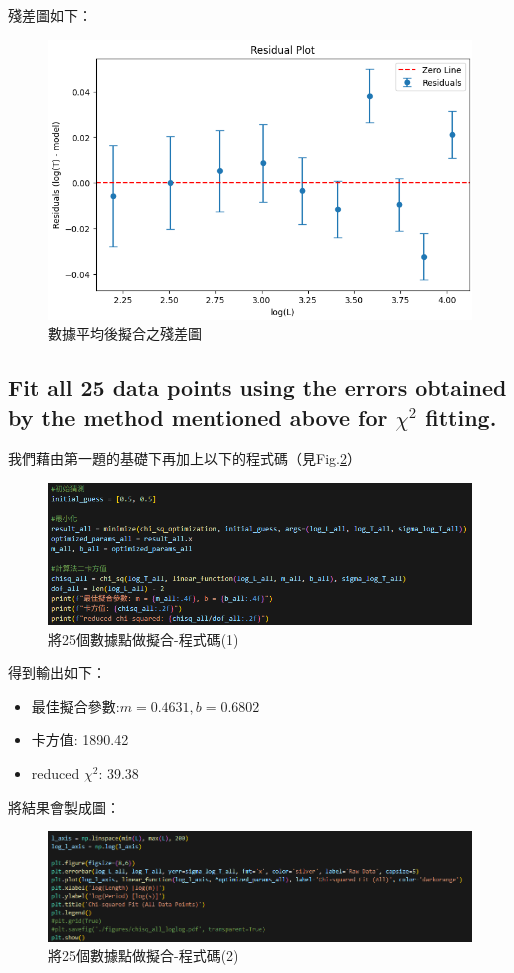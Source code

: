 \documentclass[12pt,a4paper]{article}
\begin{document}
\begin{CJK}{UTF8}{bkai}
殘差圖如下：

\begin{figure}[h]
    \centering
    \includegraphics[width=0.8\linewidth]{aaaaaaaaaaaaaaaa.png}
    \caption{數據平均後擬合之殘差圖}
    \label{fig:enter-label}
\end{figure}

\clearpage
\subsection{Fit all 25 data points using the errors obtained by the method mentioned above for $\chi ^2$ fitting.}
\hfill

我們藉由第一題的基礎下再加上以下的程式碼（見Fig.\ref{fig:Q2-1}）
\begin{figure}[h]
    \centering
    \includegraphics[width=1\linewidth]{Q2.png}
    \caption{將25個數據點做擬合-程式碼(1)}
    \label{fig:Q2-1}
\end{figure}

得到輸出如下：
\begin{itemize}
    \item 最佳擬合參數:$m = 0.4631, b = 0.6802$
    \item 卡方值: 1890.42
    \item reduced $\chi ^2$: 39.38
\end{itemize}


將結果會製成圖：
\begin{figure}[h]
    \centering
    \includegraphics[width=1\linewidth]{Q2-2.png}
    \caption{將25個數據點做擬合-程式碼(2)}
    \label{fig:Q2-2}
\end{figure}


\end{CJK}
\end{document}

